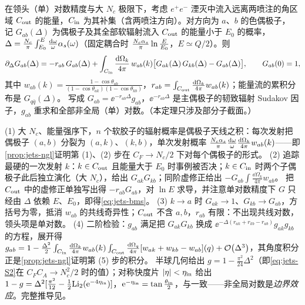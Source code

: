 \begin{theorem}\label{thm:jets-bms}
在领头（单）对数精度与大 $N_c$ 极限下，考虑 $e^+e^-$ 湮灭中流入远离两喷注的角区域 $C_{\rm out}$ 的能量，$C_{\rm in}$ 为其补集（含两喷注方向）。对方向为 $a$、$b$ 的色偶极子，
记 $G_{ab}(\Delta)$ 为偶极子及其全部软辐射流入 $C_{\rm out}$ 的能量小于 $E_0$ 的概率，$\Delta=\frac{N_c}{\pi}\int_{E_0}^{E}\frac{\mathrm{d}\omega}{\omega}\alpha_s(\omega)$（固定耦合时 $\frac{N_c\alpha_s}{\pi}\ln\frac{E}{E_0}$，$E\simeq Q/2$）。则
\begin{equation}\label{eq:jets-bms}
\partial_\Delta G_{ab}(\Delta)=-r_{ab}\,G_{ab}(\Delta)+\int_{C_{\rm in}}\frac{\mathrm{d}\Omega_k}{4\pi}\,w_{ab}(k)\big[G_{ak}(\Delta)\,G_{kb}(\Delta)-G_{ab}(\Delta)\big],\qquad G_{ab}(0)=1,
\end{equation}
其中 $w_{ab}(k)=\frac{1-\cos\theta_{ab}}{(1-\cos\theta_{ak})(1-\cos\theta_{kb})}$，$r_{ab}=\int_{C_{\rm out}}\frac{\mathrm{d}\Omega_k}{4\pi}w_{ab}(k)$；能量流的累积分布是 $G_{q\bar q}(\Delta)$。
写成 $G_{ab}=\ee^{-r_{ab}\Delta}g_{ab}$，$\ee^{-r_{ab}\Delta}$ 是主偶极子的韧致辐射 Sudakov 因子，$g_{ab}$ 重求和全部非全局（单）对数。（本定理只涉及部分子截面。）
\end{theorem}

\begin{proofsketch}
(1) 大 $N_c$、能量强序下，$n$ 个软胶子的辐射概率是偶极子天线之积\cite[式~(3.3)、(3.4)]{Banfi:2002hw}：每次发射把偶极子 $(a,b)$ 分裂为 $(a,k)$、$(k,b)$，单次发射概率 $\frac{N_c\alpha_s}{\pi}\frac{\mathrm{d}\omega}{\omega}\frac{\mathrm{d}\Omega_k}{4\pi}w_{ab}(k)$——即\cref{prop:jets-ngl}证明第 (1)、(2) 步在 $C_F\to N_c/2$ 下对每个偶极子的形式。
(2) 追踪最硬的一次发射 $k$：$k\in C_{\rm out}$ 且能量大于 $E_0$ 时事例被否决；$k\in C_{\rm in}$ 时两个子偶极子此后独立演化（大 $N_c$），给出 $G_{ak}G_{kb}$；同阶虚修正给出 $-G_{ab}\int\frac{\dd\Omega_k}{4\pi}w_{ab}$。
把 $C_{\rm out}$ 中的虚修正单独写出得 $-r_{ab}G_{ab}$，对 $\ln E$ 求导，并注意单对数精度下 $G$ 只经由 $\Delta$ 依赖 $E$、$E_0$，即得\cref{eq:jets-bms}。
(3) $k\to a$ 时 $G_{ak}\to1$、$G_{kb}\to G_{ab}$，方括号为零，抵消 $w_{ab}$ 的共线奇异性；$C_{\rm out}$ 不含 $a,b$，$r_{ab}$ 有限：不出现共线对数，领头项是单对数。
(4) 二阶检验：$g_{ab}$ 满足把 $G_{ak}G_{kb}$ 换成 $\ee^{-\Delta(r_{ak}+r_{kb}-r_{ab})}g_{ak}g_{kb}$ 的方程，展开得
$g_{ab}=1-\frac{\Delta^2}{2}\int_{C_{\rm in}}\frac{\mathrm{d}\Omega_k}{4\pi}w_{ab}(k)\int_{C_{\rm out}}\frac{\mathrm{d}\Omega_q}{4\pi}[w_{ak}+w_{kb}-w_{ab}](q)+\mathcal{O}\!\left(\Delta^3\right)$，其角度积分正是\cref{prop:jets-ngl}证明第 (5) 步的积分。
半球几何给出 $g=1-\frac{\pi^2}{24}\Delta^2$（即\cref{eq:jets-S2}在 $C_FC_A\to N_c^2/2$ 时的值）；对称快度片 $|\eta|<\eta_{\rm in}$ 给出
$1-g=\Delta^2[\frac{\pi^2}{12}-\frac12\mathrm{Li}_2(\mathrm{e}^{-4\eta_{\rm in}})]$，$\mathrm{e}^{-\eta_{\rm in}}=\tan\frac{\theta_{\rm in}}{2}$，与\cite[式~(5.5)]{Banfi:2002hw}一致——非全局对数是\emph{边界效应}。完整推导见\cite[第~4~节]{Banfi:2002hw}。
\end{proofsketch}

